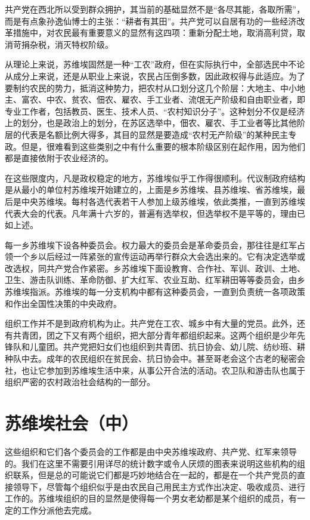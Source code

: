 \documentclass[10pt]{book}
\begin{document}
共产党在西北所以受到群众拥护，其当前的基础显然不是“各尽其能，各取所需”，而是有点象孙逸仙博士的主张：“耕者有其田”。共产党可以自居有功的一些经济改革措施中，对农民最有重要意义的显然有这四项：重新分配土地，取消高利贷，取消苛捐杂税，消灭特权阶级。

从理论上来说，苏维埃固然是一种“工农”政府，但在实际执行中，全部选民中不论从成分上来说，还是从职业上来说，农民占压倒多数，因此政权得与此适应。为了要制约农民的势力，抵消这种势力，把农村从口划分这几个阶层：大地主、中小地主、富农、中农、贫农、佃农、雇农、手工业者、流氓无产阶级和自由职业者，即专业工作者，包括教员、医生、技术人员、“农村知识分子”。这种划分不仅是经济上的划分，也是政治上的划分，在苏区选举中，佃农、雇农、手工业者等比其他阶层的代表是名额比例大得多，其目的显然是要造成“农村无产阶级”的某种民主专政。但是，很难看到这些类别之中有什么重要的根本阶级区别在起作用，因为他们都是直接依附于农业经济的。

在这些限度内，凡是政权稳定的地方，苏维埃似乎工作得很顺利。代议制政府结构是从最小的单位村苏维埃开始建立的，上面是乡苏维埃、县苏维埃、省苏维埃，最后是中央苏维埃。每村各选代表若干人参加上级苏维埃，依此类推，一直到苏维埃代表大会的代表。凡年满十六岁的，普遍有选举权，但选举权不是平等的，理由已如上述。

每一乡苏维埃下设各种委员会。权力最大的委员会是革命委员会，那往往是红军占领一个乡以后经过一阵紧张的宣传运动再举行群众大会选出来的。它有决定选举或改选权，同共产党合作紧密。乡苏维埃下面设教育、合作社、军训、政训、土地、卫生、游击队训练、革命防御、扩大红军、农业互助、红军耕田等等委员会，由乡苏维埃指派。苏维埃的每一分支机构中都有这种委员会，一直到负责统一各项政策和作出全国性决策的中央政府。

组织工作并不是到政府机构为止。共产党在工农、城乡中有大量的党员。此外，还有共青团，团之下又有两个组织，把大部分青年都组织起来。这两个组织是少年先锋队和儿童团。共产党把妇女们也组织到共青团、抗日协会、幼儿院、纺纱班、耕种队中去。成年的农民组织在贫民会、抗日协会中。甚至哥老会这个古老的秘密会社，也让它参加到苏维埃生活中来，从事公开合法的活动。农卫队和游击队也属于组织严密的农村政治社会结构的一部分。



\section{苏维埃社会（中）}

这些组织和它们各个委员会的工作都是由中央苏维埃政府、共产党、红军来领导的。我们在这里不需要引用详尽的统计数字或令人厌烦的图表来说明这些机构的组织联系，但是总的可能说它们都是巧妙地结合在一起的，都是在一个共产党员的直接领导下，尽管每个组织似乎是由农民自己用民主方式作出决定、吸收成员、进行工作的。苏维埃组织的目的显然是使得每一个男女老幼都是某个组织的成员，有一定的工作分派他去完成。
\end{document}
